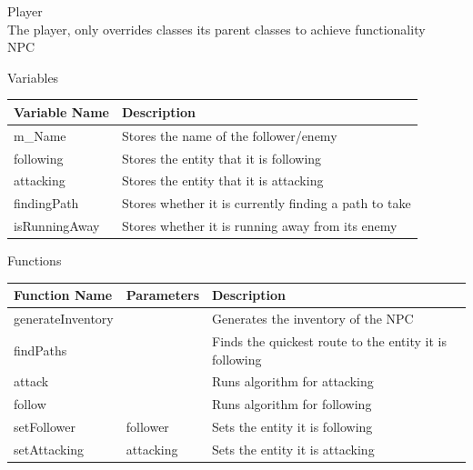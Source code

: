 \documentclass{article}
\begin{document}
                Player \\
                The player, only overrides classes its parent classes to achieve functionality \\
                NPC
                \begin{center}
                    Variables
                    \begin{tabular}{ | m{} | m{} | }
                        \hline
                        \textbf{Variable Name} & \textbf{Description} \\
                        \hline
                        m\_Name & Stores the name of the follower/enemy \\
                        \hline
                        following & Stores the entity that it is following \\
                        \hline
                        attacking & Stores the entity that it is attacking \\
                        \hline
                        findingPath & Stores whether it is currently finding a path to take \\
                        \hline
                        isRunningAway & Stores whether it is running away from its enemy \\
                        \hline
                    \end{tabular}
                    Functions
                    \begin{tabular}{ | m{} | m{}| m{} | }
                        \hline
                        \textbf{Function Name} & \textbf{Parameters} & \textbf{Description} \\
                        \hline
                        generateInventory & & Generates the inventory of the NPC \\
                        \hline
                        findPaths & & Finds the quickest route to the entity it is following \\
                        \hline
                        attack & & Runs algorithm for attacking \\
                        \hline
                        follow & & Runs algorithm for following \\
                        \hline
                        setFollower & follower & Sets the entity it is following \\
                        \hline
                        setAttacking & attacking & Sets the entity it is attacking \\
                        \hline
                    \end{tabular}
                \end{center}
            \clearpage
\end{document}
